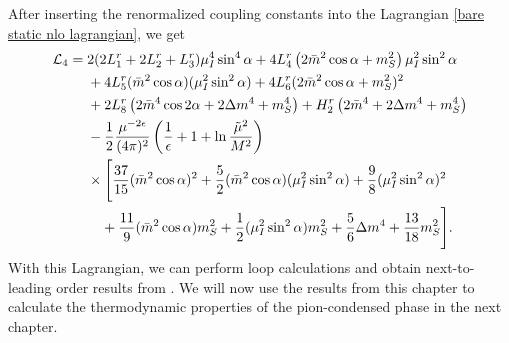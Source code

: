 After inserting the renormalized coupling constants into the Lagrangian \autoref{bare static nlo lagrangian},  we get
%
\begin{align}
    \label{nlo static lagrangian}
    \nonumber
    \mathcal{L}_4
    = {}&
    2(2L_1^r + 2L_2^r + L_3^r) \mu_I^4 \sin^4\alpha
    + 4  L_4^r \left( 2 \bar m^2 \cos\alpha + m_S^2 \right) \mu_I^2\sin^2\alpha
    \\ \nonumber
    & 
    + 4 L_5^r (\bar m^2 \cos\alpha) (\mu_I^2  \sin^2 \alpha )
    + 4 L_6^r (2\bar m^2\cos\alpha + m_S^2)^2
    \\ \nonumber &
    + 2 L_8^r \left(2 \bar m^4 \cos2\alpha + 2 \Delta m^4 + m_S^4\right)
    + H_2^r \left(2\bar m^4 + 2\Delta m^4 + m_S^4 \right)
    \\ \nonumber &
    - \frac{1}{2}\frac{\mu^{-2\epsilon}}{(4\pi)^2}
    \left( \frac{1}{\epsilon} + 1 + \ln\frac{\tilde \mu^2}{M^2} \right)
    \\\nonumber
    & \times
    \Bigg[
        \frac{37}{15} (\bar m^2 \cos\alpha)^2
        +\frac{5}{2} (\bar m^2 \cos\alpha)(\mu_I^2\sin^2\alpha)
        +\frac{9}{8} (\mu_I^2\sin^2\alpha)^2 \\
        & \quad
        +\frac{11}{9} (\bar m^2 \cos\alpha)m_S^2
        +\frac{1}{2} (\mu_I^2\sin^2\alpha)m_S^2
        +\frac{5}{6} \Delta m^4
        +\frac{13}{18} m_S^2
    \Bigg].
\end{align}
%
With this Lagrangian, we can perform loop calculations and obtain next-to-leading order results from \chpt.
We will now use the results from this chapter to calculate the thermodynamic properties of the pion-condensed phase in the next chapter.

